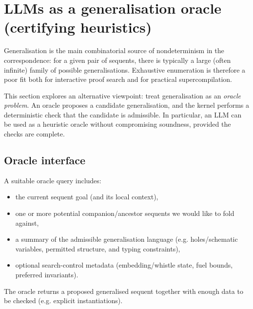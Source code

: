 \section{LLMs as a generalisation oracle (certifying heuristics)}
\label{sec:llm-oracle}

Generalisation is the main combinatorial source of nondeterminism in the correspondence: for a given pair of sequents, there is typically a large (often infinite) family of possible generalisations.
Exhaustive enumeration is therefore a poor fit both for interactive proof search and for practical supercompilation.

This section explores an alternative viewpoint: treat generalisation as an \emph{oracle problem}.
An oracle proposes a candidate generalisation, and the kernel performs a deterministic check that the candidate is admissible.
In particular, an LLM can be used as a heuristic oracle without compromising soundness, provided the checks are complete.

\subsection{Oracle interface}
A suitable oracle query includes:
\begin{itemize}[leftmargin=*]
\item the current sequent goal (and its local context),
\item one or more potential companion/ancestor sequents we would like to fold against,
\item a summary of the admissible generalisation language (e.g. holes/schematic variables, permitted structure, and typing constraints),
\item optional search-control metadata (embedding/whistle state, fuel bounds, preferred invariants).
\end{itemize}
The oracle returns a proposed generalised sequent together with enough data to be checked (e.g. explicit instantiations).

